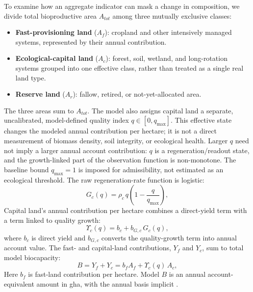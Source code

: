 \documentclass[preprint,12pt,authoryear]{elsarticle}
\newcommand{\Ups}{\Upsilon_c}
\begin{document}
To examine how an aggregate indicator can mask a change in composition, we divide total bioproductive area $A_{tot}$ among three mutually exclusive classes:
\begin{itemize}
  \item \textbf{Fast-provisioning land} ($A_f$): cropland and other intensively managed systems, represented by their annual contribution.
  \item \textbf{Ecological-capital land} ($A_c$): forest, soil, wetland, and long-rotation systems grouped into one effective class, rather than treated as a single real land type.
  \item \textbf{Reserve land} ($A_r$): fallow, retired, or not-yet-allocated area.
\end{itemize}
The three areas sum to $A_{tot}$. The model also assigns capital land a separate, uncalibrated, model-defined quality index $q\in[0,q_{\max}]$. This effective state changes the modeled annual contribution per hectare; it is not a direct measurement of biomass density, soil integrity, or ecological health. Larger $q$ need not imply a larger annual account contribution: $q$ is a regeneration/readout state, and the growth-linked part of the observation function is non-monotone. The baseline bound $q_{\max}=1$ is imposed for admissibility, not estimated as an ecological threshold. The raw regeneration-rate function is logistic:
\begin{equation}\label{eq:Gc}
G_c(q)=\rho_c\,q\left(1-\frac{q}{q_{\max}}\right),
\end{equation}
Capital land's annual contribution per hectare combines a direct-yield term with a term linked to quality growth:
\begin{equation}\label{eq:Ups}
\Ups(q)=b_c+b_{G,c}\,G_c(q),
\end{equation}
where $b_c$ is direct yield and $b_{G,c}$ converts the quality-growth term into annual account value. The fast- and capital-land contributions, $Y_f$ and $Y_c$, sum to total model biocapacity:
\begin{equation}\label{eq:B}
B=Y_f+Y_c=b_f A_f+\Ups(q)\,A_c ,
\end{equation}
Here $b_f$ is fast-land contribution per hectare. Model $B$ is an annual account-equivalent amount in gha, with the annual basis implicit \citep{GFNStandards2009,GFNGuidebook2019}.
\end{document}
